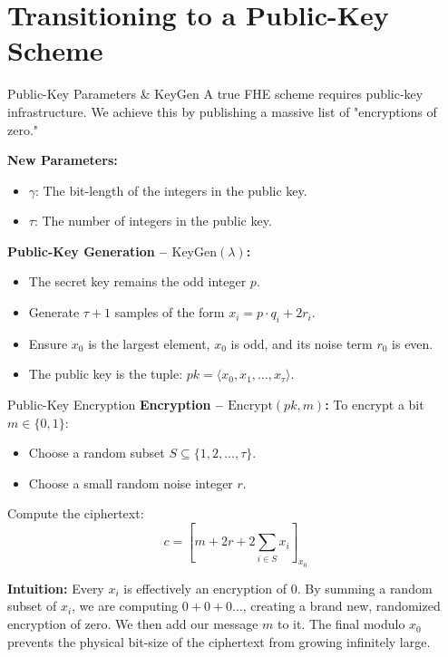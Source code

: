 \documentclass[10pt, aspectratio=169]{beamer}
\begin{document}
\section{Transitioning to a Public-Key Scheme}
\begin{frame}{Public-Key Parameters \& KeyGen}
    A true FHE scheme requires public-key infrastructure. We achieve this by publishing a massive list of "encryptions of zero."
    \pause

    \vspace{0.2cm}
    \textbf{New Parameters:}
    \begin{itemize}
        \item $\gamma$: The bit-length of the integers in the public key.
        \item $\tau$: The number of integers in the public key.
    \end{itemize}
    \pause
    
    \vspace{0.2cm}
    \textbf{Public-Key Generation -- $\text{KeyGen}(\lambda)$:}
    \begin{itemize}
        \item The secret key remains the odd integer $p$.
        \item Generate $\tau + 1$ samples of the form $x_i = p \cdot q_i + 2r_i$.
        \item Ensure $x_0$ is the largest element, $x_0$ is odd, and its noise term $r_0$ is even.
        \item The public key is the tuple: $pk = \langle x_0, x_1, \dots, x_\tau \rangle$.
    \end{itemize}
\end{frame}

\begin{frame}{Public-Key Encryption}
    \textbf{Encryption -- $\text{Encrypt}(pk, m)$:}
    To encrypt a bit $m \in \{0,1\}$:
    \begin{itemize}
        \item Choose a random subset $S \subseteq \{1, 2, \dots, \tau\}$.
        \item Choose a small random noise integer $r$.
    \end{itemize}
    \pause
    
    \vspace{0.3cm}
    Compute the ciphertext:
    $$c = \left[ m + 2r + 2\sum_{i \in S} x_i \right]_{x_0}$$
    \pause
    
    \vspace{0.3cm}
    \textbf{Intuition:} 
    Every $x_i$ is effectively an encryption of $0$. By summing a random subset of $x_i$, we are computing $0 + 0 + 0 \dots$, creating a brand new, randomized encryption of zero. We then add our message $m$ to it. The final modulo $x_0$ prevents the physical bit-size of the ciphertext from growing infinitely large.
\end{frame}
\end{document}
